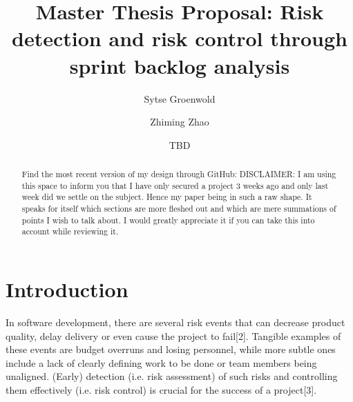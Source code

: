 \documentclass[sigconf]{acmart}
\begin{document}
\title{Master Thesis Proposal: Risk detection and risk control through sprint backlog analysis}

\author{Sytse Groenwold}

\author{Zhiming Zhao}

\author{TBD}

\renewcommand{\shortauthors}{Groenwold, S.}

\begin{abstract}
Find the most recent version of my design through GitHub: 
DISCLAIMER: I am using this space to inform you that I have only secured a project 3 weeks ago and only last week did we settle on the subject. Hence my paper being in such a raw shape. It speaks for itself which sections are more fleshed out and which are mere summations of points I wish to talk about. I would greatly appreciate it if you can take this into account while reviewing it.
\end{abstract}


\maketitle

\section{Introduction}
In software development, there are several risk events that can decrease product quality, delay delivery or even cause the project to fail[2]. 
Tangible examples of these events are budget overruns and losing personnel, while more subtle ones include a lack of clearly defining work to be done or team members being unaligned. 
(Early) detection (i.e. risk assessment) of such risks and controlling them effectively (i.e. risk control) is crucial for the success of a project[3].
\end{document}
